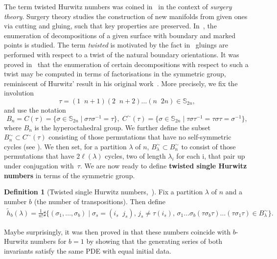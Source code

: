 \documentclass[10pt]{amsart}
\theoremstyle{plain}
\theoremstyle{definition}
\newtheorem{defi}[defi]{Definition}
\theoremstyle{definition}
\theoremstyle{plain}
\theoremstyle{plain}
\theoremstyle{remark}
\theoremstyle{plain}
\theoremstyle{plain}
\begin{document}
The term twisted Hurwitz numbers was coined in~\cite{BF21} in the context of \textit{surgery theory}. Surgery theory studies the construction of new manifolds from given ones via cutting and gluing, such that key properties are preserved. In~\cite{BF21}, the enumeration of decompositions of a given surface with boundary and marked points is studied. The term \textit{twisted} is motivated by the fact in~\cite{BF21} gluings are performed with respect to a twist of the natural boundary orientations. It was proved in~\cite{BF21} that the enumeration of certain decompositions with respect to such a twist may be computed in terms of factorisations in the symmetric group, reminiscent of Hurwitz' result in his original work~\cite{hurwitz1892algebraische}. More precisely, we fix the involution $$\tau= (1\;\; n+1) (2 \;\;n+2) \ldots (n \;\;2n)\in \mathbb{S}_{2n},$$ and use the notation
\begin{equation*}
    B_n=C(\tau)=\{\sigma \in \mathbb{S}_{2n} \mid  \sigma \tau \sigma^{-1}=\tau\}, \; C^\sim(\tau)=\{\sigma \in \mathbb{S}_{2n} \mid  \tau \sigma \tau^{-1} = \tau \sigma \tau =  \sigma^{-1}\},
\end{equation*}
where $B_n$ is the hyperoctahedral group. We further define the subset $B^\sim_n \subset C^\sim(\tau)$ consisting of those permutations that have no self-symmetric cycles (see \cite[Lemma~2.1]{BF21}). We then set, for a partition $\lambda$ of $n$,  $B^\sim_\lambda\subset B^\sim_n$ to consist of those permutations that have $2\ell(\lambda)$ cycles, two of length $\lambda_i$ for each i, that pair up under conjugation with~$\tau$. We are now ready to define \textbf{twisted single Hurwitz numbers} in terms of the symmetric group.

\begin{defi}[Twisted single Hurwitz numbers,~\cite{BF21}]
\label{def:twisthur}
Fix a partition $\lambda$ of $n$ and a number $b$ (the number of transpositions).
Then define
\begin{align*}
\tilde{h}_{b}(\lambda)= \frac{1}{n!}\sharp \Big\{(\sigma_1,\ldots,\sigma_b) \mid  \sigma_s=(i_s\;\;j_s),\, j_s\neq \tau(i_s),\, \sigma_1\ldots\sigma_b (\tau\sigma_b\tau)\ldots (\tau\sigma_1\tau) \in B^{\sim}_\lambda\Big\}.
\end{align*}
\end{defi}

Maybe surprisingly, it was then proved in \cite[Theorem 3.2]{BF21} that these numbers coincide with $b$-Hurwitz numbers for $b=1$ by showing that the generating series of both invariants satisfy the same PDE with equal initial data.
\end{document}
